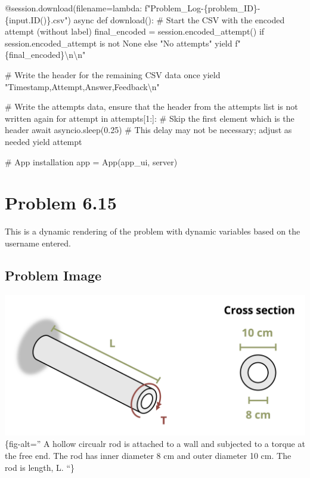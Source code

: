 \documentclass[
  letterpaper,
  DIV=11,
  numbers=noendperiod]{scrreprt}
\newenvironment{Shaded}{\begin{snugshade}}{\end{snugshade}}
\newcommand{\NormalTok}[1]{\textcolor[rgb]{0.00,0.23,0.31}{#1}}
\begin{document}
\begin{Shaded}
\begin{Highlighting}[]
\NormalTok{    @session.download(filename=lambda: f"Problem\_Log{-}\{problem\_ID\}{-}\{input.ID()\}.csv")}
\NormalTok{    async def download():}
\NormalTok{        \# Start the CSV with the encoded attempt (without label)}
\NormalTok{        final\_encoded = session.encoded\_attempt() if session.encoded\_attempt is not None else "No attempts"}
\NormalTok{        yield f"\{final\_encoded\}\textbackslash{}n\textbackslash{}n"}
        
\NormalTok{        \# Write the header for the remaining CSV data once}
\NormalTok{        yield "Timestamp,Attempt,Answer,Feedback\textbackslash{}n"}
        
\NormalTok{        \# Write the attempts data, ensure that the header from the attempts list is not written again}
\NormalTok{        for attempt in attempts[1:]:  \# Skip the first element which is the header}
\NormalTok{            await asyncio.sleep(0.25)  \# This delay may not be necessary; adjust as needed}
\NormalTok{            yield attempt}


\NormalTok{\# App installation}
\NormalTok{app = App(app\_ui, server)}
\end{Highlighting}
\end{Shaded}

\chapter*{Problem 6.15}\label{problem-6.15}


This is a dynamic rendering of the problem with dynamic variables based
on the username entered.

\section*{Problem Image}\label{problem-image-68}


\includegraphics{images/274.png}\{fig-alt='' A hollow circualr rod is
attached to a wall and subjected to a torque at the free end. The rod
has inner diameter 8 cm and outer diameter 10 cm. The rod is length, L.
``\}
\end{document}
